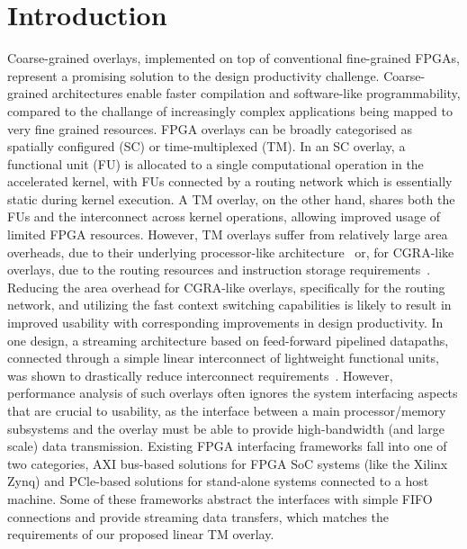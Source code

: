 \section{Introduction}
\label{section_1}
Coarse-grained overlays, implemented on top of conventional fine-grained FPGAs, represent a promising solution to the design productivity challenge. 
Coarse-grained architectures enable faster compilation and software-like programmability, compared to the challange of increasingly complex applications being mapped to very fine grained resources.  
FPGA overlays can be broadly categorised as spatially configured (SC) or time-multiplexed (TM). 
In an SC overlay, a functional unit (FU) is allocated to a single computational operation in the accelerated kernel, with FUs connected by a routing network which is essentially static during kernel execution. 
A TM overlay, on the other hand, shares both the FUs and the interconnect across kernel operations, allowing improved usage of limited FPGA resources. 
However, TM overlays suffer from relatively large area overheads, due to their underlying processor-like architecture~\cite{severance2013embedded, rashid2014comparing, al2016fgpu, gray2016grvi, duarte2017scratch} or, for CGRA-like overlays, due to the routing resources and instruction storage requirements~\cite{paul2012remorph, liu2015quickdough}. 
Reducing the area overhead for CGRA-like overlays, specifically for the routing network, and utilizing the fast context switching capabilities is likely to result in improved usability with corresponding improvements in design productivity. 
In one design, a streaming architecture based on feed-forward pipelined datapaths, connected through a simple linear interconnect of lightweight functional units, was shown to drastically reduce interconnect requirements~\cite{li2018time}. 
However, performance analysis of such overlays often ignores the system interfacing aspects that are crucial to usability, as the interface between a main processor/memory subsystems and the overlay must be able to provide high-bandwidth (and large scale) data transmission.
Existing FPGA interfacing frameworks fall into one of two categories, AXI bus-based solutions for FPGA SoC systems (like the Xilinx Zynq) and PCle-based solutions for stand-alone systems connected to a host machine. 
Some of these frameworks abstract the interfaces with simple FIFO connections and provide streaming data transfers, which matches the requirements of our proposed linear TM overlay. 

